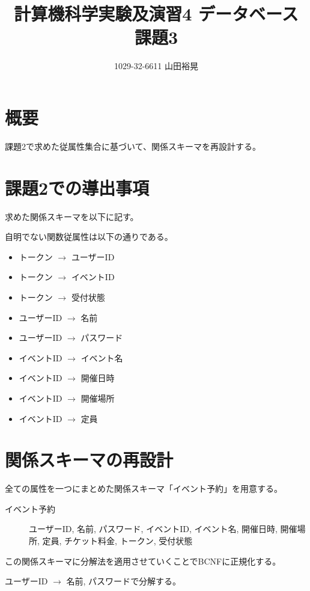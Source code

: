 \documentclass[dvipdfmx]{jarticle}
\begin{document}
\title{計算機科学実験及演習4 データベース 課題3}
\author{1029-32-6611 山田裕晃}
\maketitle

\section{概要}
課題2で求めた従属性集合に基づいて、関係スキーマを再設計する。

\section{課題2での導出事項}
求めた関係スキーマを以下に記す。

自明でない関数従属性は以下の通りである。
\begin{itemize}
  \item {トークン} $\rightarrow$ {ユーザーID}
  \item {トークン} $\rightarrow$ {イベントID}
  \item {トークン} $\rightarrow$ {受付状態}
  \item {ユーザーID} $\rightarrow$ {名前}
  \item {ユーザーID} $\rightarrow$ {パスワード}
  \item {イベントID} $\rightarrow$ {イベント名}
  \item {イベントID} $\rightarrow$ {開催日時}
  \item {イベントID} $\rightarrow$ {開催場所}
  \item {イベントID} $\rightarrow$ {定員}
\end{itemize}

\section{関係スキーマの再設計}

全ての属性を一つにまとめた関係スキーマ「イベント予約」を用意する。
\begin{description}
  \item[イベント予約] {ユーザーID, 名前, パスワード, イベントID, イベント名, 開催日時, 開催場所, 定員, チケット料金, トークン, 受付状態}
\end{description}

この関係スキーマに分解法を適用させていくことでBCNFに正規化する。

{ユーザーID} $\rightarrow$ {名前, パスワード}で分解する。
\end{document}
